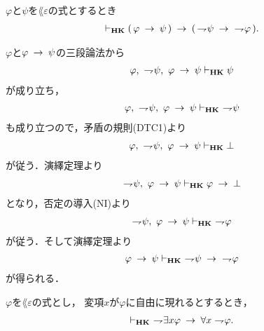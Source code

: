 	\begin{screen}
		\begin{thm}[対偶律$1$]\label{classic:contraposition_1}
			$\varphi$と$\psi$を$\lang{\varepsilon}$の式とするとき
			\begin{align}
				\vdash_{{\scriptsize \mbox{{\bf HK}}}} (\, \varphi \hspace{0.25em}\rightarrow\hspace{0.25em} \psi\, )
				\hspace{0.25em}\rightarrow\hspace{0.25em} (\, \rightharpoondown\hspace{-0.25em} \psi \hspace{0.25em}\rightarrow\hspace{0.25em}\ \rightharpoondown\hspace{-0.25em} \varphi\, ).
			\end{align}
		\end{thm}
	\end{screen}
	
	\begin{sketch}
		$\varphi$と$\varphi \hspace{0.25em}\rightarrow\hspace{0.25em} \psi$の三段論法から
		\begin{align}
			\varphi,\ \rightharpoondown\hspace{-0.25em} \psi,\ \varphi \hspace{0.25em}\rightarrow\hspace{0.25em} \psi
			\vdash_{{\scriptsize \mbox{{\bf HK}}}} \psi
		\end{align}
		が成り立ち，
		\begin{align}
			\varphi,\ \rightharpoondown\hspace{-0.25em} \psi,\ \varphi \hspace{0.25em}\rightarrow\hspace{0.25em} \psi
			\vdash_{{\scriptsize \mbox{{\bf HK}}}}\ \rightharpoondown\hspace{-0.25em} \psi
		\end{align}
		も成り立つので，矛盾の規則(DTC1)より
		\begin{align}
			\varphi,\ \rightharpoondown\hspace{-0.25em} \psi,\ \varphi \hspace{0.25em}\rightarrow\hspace{0.25em} \psi
			\vdash_{{\scriptsize \mbox{{\bf HK}}}} \bot
		\end{align}
		が従う．演繹定理より
		\begin{align}
			\rightharpoondown\hspace{-0.25em} \psi,\ \varphi \hspace{0.25em}\rightarrow\hspace{0.25em} \psi
			\vdash_{{\scriptsize \mbox{{\bf HK}}}} \varphi \hspace{0.25em}\rightarrow\hspace{0.25em} \bot
		\end{align}
		となり，否定の導入(NI)より
		\begin{align}
			\rightharpoondown\hspace{-0.25em} \psi,\ \varphi \hspace{0.25em}\rightarrow\hspace{0.25em} \psi
			\vdash_{{\scriptsize \mbox{{\bf HK}}}}\ \rightharpoondown\hspace{-0.25em} \varphi
		\end{align}
		が従う．そして演繹定理より
		\begin{align}
			\varphi \rarrow \psi
			\provable{\mbox{{\bf HK}}}\ \negation \psi \rarrow\ \negation \varphi
		\end{align}
		が得られる．
		\QED
	\end{sketch}
	
	\begin{screen}
		\begin{thm}
		\label{classic:weak_De_Morgan_law_1}
			$\varphi$を$\lang{\varepsilon}$の式とし，
			変項$x$が$\varphi$に自由に現れるとするとき，
			\begin{align}
				\vdash_{{\scriptsize \mbox{{\bf HK}}}}
				\ \rightharpoondown\hspace{-0.25em} \exists x \varphi \hspace{0.25em}\rightarrow\hspace{0.25em} \forall x \rightharpoondown\hspace{-0.25em} \varphi.
			\end{align}
		\end{thm}
	\end{screen}
	
